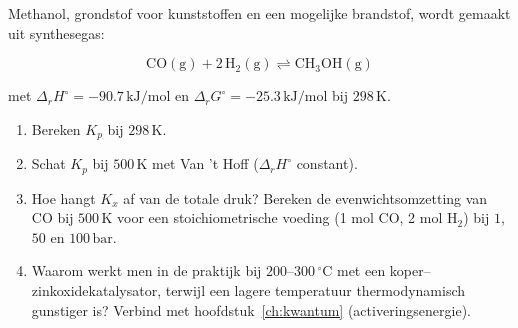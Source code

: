 \begin{oefening}
Methanol, grondstof voor kunststoffen en een mogelijke brandstof, wordt gemaakt uit synthesegas:

\[
\mathrm{CO(g) + 2\,H_2(g) \rightleftharpoons CH_3OH(g)}
\]

met \(\Delta_r H^\circ = -90.7\,\mathrm{kJ/mol}\) en \(\Delta_r G^\circ = -25.3\,\mathrm{kJ/mol}\) bij \(298\,\mathrm{K}\).

\begin{enumerate}
\item[(a)]
  Bereken \(K_p\) bij \(298\,\mathrm{K}\).
\item[(b)]
  Schat \(K_p\) bij \(500\,\mathrm{K}\) met Van 't Hoff (\(\Delta_r H^\circ\) constant).
\item[(c)]
  Hoe hangt \(K_x\) af van de totale druk? Bereken de evenwichtsomzetting van CO bij \(500\,\mathrm{K}\) voor een stoichiometrische voeding (1 mol CO, 2 mol \(\mathrm{H_2}\)) bij \(1\), \(50\) en \(100\,\mathrm{bar}\).
\item[(d)]
  Waarom werkt men in de praktijk bij \(200\)--\(300\,^\circ\mathrm{C}\) met een koper--zinkoxidekatalysator, terwijl een lagere temperatuur thermodynamisch gunstiger is? Verbind met hoofdstuk~\ref{ch:kwantum} (activeringsenergie).
\end{enumerate}
\end{oefening}
